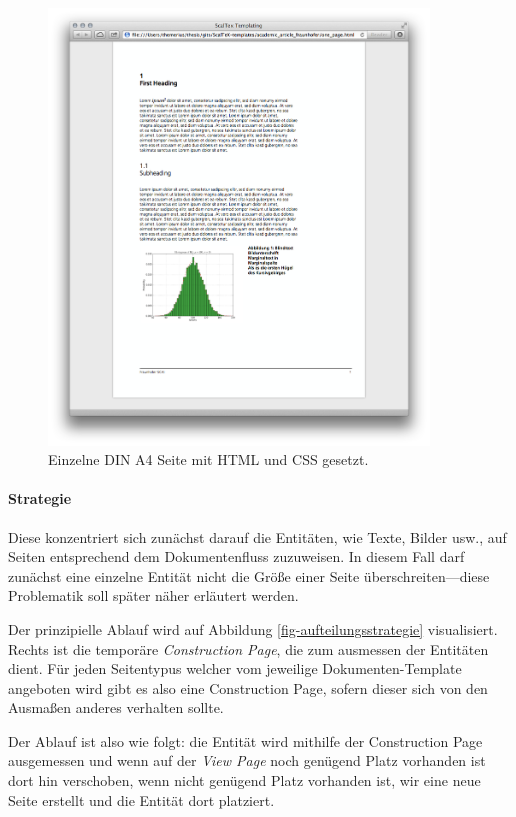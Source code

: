 \newpage
\begin{figure}[h!]
  \centering
    \includegraphics[width=0.9\textwidth]{figures/one_page.png}
  \caption{Einzelne DIN A4 Seite mit HTML und CSS gesetzt.}\label{fig-one_page}
\end{figure}
\newpage

\paragraph{Strategie}
Diese konzentriert sich zunächst darauf die Entitäten, wie Texte, Bilder usw.,
auf Seiten entsprechend dem Dokumentenfluss zuzuweisen.
In diesem Fall darf zunächst eine
einzelne Entität nicht die Größe einer Seite überschreiten---diese
Problematik soll später näher erläutert werden.

Der prinzipielle Ablauf wird auf Abbildung \ref{fig-aufteilungsstrategie}
visualisiert. Rechts ist die temporäre \emph{Construction Page}, die zum
ausmessen der Entitäten dient. Für jeden Seitentypus welcher vom jeweilige
Dokumenten-Template angeboten wird gibt es also eine Construction Page, sofern
dieser sich von den Ausmaßen anderes verhalten sollte.

Der Ablauf ist also wie folgt: die Entität wird mithilfe der Construction
Page ausgemessen und wenn auf der \emph{View Page} noch genügend Platz
vorhanden ist dort hin verschoben, wenn nicht genügend Platz vorhanden ist,
wir eine neue Seite erstellt und die Entität dort platziert.

